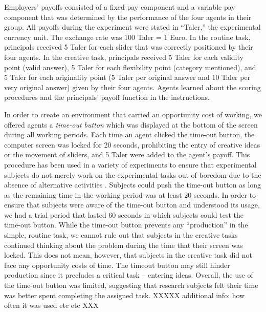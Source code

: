 Employers' payoffs consisted of a fixed  pay
component and a variable pay component that was determined by the 
performance of the four agents in their group. All payoffs during 
the experiment were stated in ``Taler,'' the experimental currency unit. 
The exchange rate was 100 Taler = 1 Euro. 
In the routine task, principals received 5 Taler for
each slider that was correctly positioned by their four agents.
In the creative task, principals received 5 Taler for each
validity point (valid answer), 5 Taler for each flexibility point 
(category mentioned), and 5 Taler for each originality point 
(5 Taler per original answer and 10 Taler per very original answer) given 
by their four agents. Agents learned about the scoring procedures  and the principals' payoff function in the instructions. 

In order to create an environment that carried an opportunity cost of working, we offered agents 
a \textit{time-out button} \citep{Mohnen08} which was displayed at the bottom 
of the screen during all working periods. Each time an agent clicked the 
time-out button, the computer screen was locked for 20 seconds, 
prohibiting the entry of creative ideas or the movement of sliders, and 5 Taler
were added to the agent's payoff. This procedure has been used in a variety of experiments
to ensure that experimental subjects do not merely work on the experimental tasks
out of boredom due to the absence of alternative activities \citep{Eckartz2011,Mohnen08}. 
Subjects could push the time-out button as long as the remaining time in the working period was at least 20 seconds. 
In order to ensure that subjects were aware of the time-out button and
understood its usage, we had a trial period that lasted 60 seconds in which subjects could test the time-out button. While the time-out button prevents any ``production'' in the simple, routine task, we cannot rule out that subjects in the creative tasks continued thinking about the problem during the time that their screen was locked. This does not mean, however, that subjects in the creative task did not face any opportunity costs of time.  The timeout button may still hinder production since it precludes a critical task -- entering ideas.   Overall, the use of the time-out button was limited, suggesting that research subjects felt their time was better spent completing the assigned task. XXXXX additional info: how often it was used etc etc XXX


